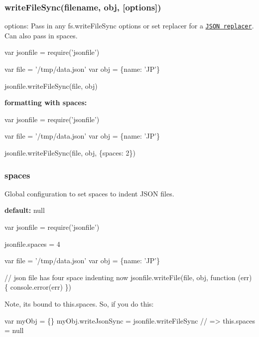 \subsubsection*{write\+File\+Sync(filename, obj, \mbox{[}options\mbox{]})}

{\ttfamily options}\+: Pass in any {\ttfamily fs.\+write\+File\+Sync} options or set {\ttfamily replacer} for a \href{https://developer.mozilla.org/en-US/docs/Web/JavaScript/Reference/Global_Objects/JSON/stringify}{\tt J\+S\+ON replacer}. Can also pass in {\ttfamily spaces}.


\begin{DoxyCode}
var jsonfile = require('jsonfile')

var file = '/tmp/data.json'
var obj = \{name: 'JP'\}

jsonfile.writeFileSync(file, obj)
\end{DoxyCode}


{\bfseries formatting with spaces\+:}


\begin{DoxyCode}
var jsonfile = require('jsonfile')

var file = '/tmp/data.json'
var obj = \{name: 'JP'\}

jsonfile.writeFileSync(file, obj, \{spaces: 2\})
\end{DoxyCode}


\subsubsection*{spaces}

Global configuration to set spaces to indent J\+S\+ON files.

{\bfseries default\+:} {\ttfamily null}


\begin{DoxyCode}
var jsonfile = require('jsonfile')

jsonfile.spaces = 4

var file = '/tmp/data.json'
var obj = \{name: 'JP'\}

// json file has four space indenting now
jsonfile.writeFile(file, obj, function (err) \{
  console.error(err)
\})
\end{DoxyCode}


Note, it\textquotesingle{}s bound to {\ttfamily this.\+spaces}. So, if you do this\+:


\begin{DoxyCode}
var myObj = \{\}
myObj.writeJsonSync = jsonfile.writeFileSync
// => this.spaces = null
\end{DoxyCode}


